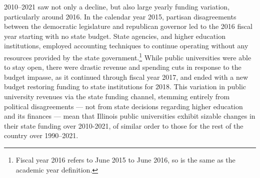 2010--2021 saw not only a decline, but also large yearly funding variation, particularly around 2016.
In the calendar year 2015, partisan disagreements between the democratic legislature and republican governor led to the 2016 fiscal year starting with no state budget.
State agencies, and higher education institutions, employed accounting techniques to continue operating without any resources provided by the state government.\footnote{
    Fiscal year 2016 refers to June 2015 to June 2016, so is the same as the academic year definition.
}
While public universities were able to stay open, there were drastic revenue and spending cuts in response to the budget impasse, as it continued through fiscal year 2017, and ended with a new budget restoring funding to state institutions for 2018.
This variation in public university revenues via the state funding channel, stemming entirely from political disagreements --- not from state decisions regarding higher education and its finances \citep{young2020squandered} --- mean that Illinois public universities exhibit sizable changes in their state funding over 2010-2021, of similar order to those for the rest of the country over 1990--2021.
